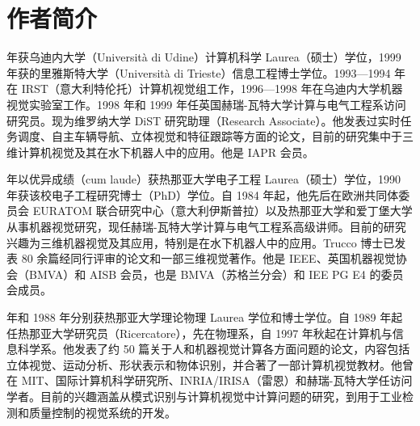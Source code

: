 \documentclass[a4paper,twocolumn,zihao=5,fontset=none,UTF8]{ctexart}
\begin{document}
\section*{作者简介}
{\small
{} 年获乌迪内大学（Universit\`a di Udine）计算机科学 Laurea（硕士）学位，1999 年获的里雅斯特大学（Universit\`a di Trieste）信息工程博士学位。1993—1994 年在 IRST（意大利特伦托）计算机视觉组工作，1996—1998 年在乌迪内大学机器视觉实验室工作。1998 年和 1999 年任英国赫瑞-瓦特大学计算与电气工程系访问研究员。现为维罗纳大学 DiST 研究助理（Research Associate）。他发表过实时任务调度、自主车辆导航、立体视觉和特征跟踪等方面的论文，目前的研究集中于三维计算机视觉及其在水下机器人中的应用。他是 IAPR 会员。

 年以优异成绩（cum laude）获热那亚大学电子工程 Laurea（硕士）学位，1990 年获该校电子工程研究博士（PhD）学位。自 1984 年起，他先后在欧洲共同体委员会 EURATOM 联合研究中心（意大利伊斯普拉）以及热那亚大学和爱丁堡大学从事机器视觉研究，现任赫瑞-瓦特大学计算与电气工程系高级讲师。目前的研究兴趣为三维机器视觉及其应用，特别是在水下机器人中的应用。Trucco 博士已发表 80 余篇经同行评审的论文和一部三维视觉著作。他是 IEEE、英国机器视觉协会（BMVA）和 AISB 会员，也是 BMVA（苏格兰分会）和 IEE PG E4 的委员会成员。

 年和 1988 年分别获热那亚大学理论物理 Laurea 学位和博士学位。自 1989 年起任热那亚大学研究员（Ricercatore），先在物理系，自 1997 年秋起在计算机与信息科学系。他发表了约 50 篇关于人和机器视觉计算各方面问题的论文，内容包括立体视觉、运动分析、形状表示和物体识别，并合著了一部计算机视觉教材。他曾在 MIT、国际计算机科学研究所、INRIA/IRISA（雷恩）和赫瑞-瓦特大学任访问学者。目前的兴趣涵盖从模式识别与计算机视觉中计算问题的研究，到用于工业检测和质量控制的视觉系统的开发。
\par}
\end{document}
